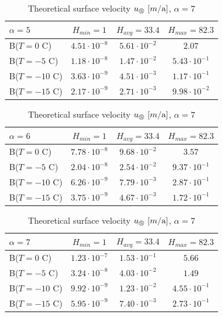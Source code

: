 \begin{table}[H]
    \centering
    	\caption{Theoretical surface velocity $u_\circledS\,\left[m / \text{a} \right]$, $\alpha = 5$}
	\begin{tabular}{lccc}
	\toprule
	$\alpha=5$ & $H_{min} = 1$ & $H_{avg}=33.4$ & $H_{max} = 82.3$\\
	\midrule
	B($T=0$ C) & $4.51 \cdot 10^{-8}$ & $5.61 \cdot 10^{-2}$ & $2.07$ \\
	B($T=-5$ C) & $1.18 \cdot 10^{-8}$ & $1.47 \cdot 10^{-2}$ & $5.43 \cdot 10^{-1}$ \\
	B($T=-10$ C) & $3.63 \cdot 10^{-9}$ & $4.51 \cdot 10^{-3}$ & $1.17 \cdot 10^{-1}$ \\

	B($T=-15$ C) & $2.17 \cdot 10^{-9}$ & $2.71 \cdot 10^{-3}$ & $9.98 \cdot 10^{-2}$\\
	\bottomrule	
	\end{tabular}
	\label{GPS:tab:theorytable5}
	
	\caption{Theoretical surface velocity $u_\circledS\,\left[m / \text{a} \right]$, $\alpha = 6$}
	\begin{tabular}{lccc}
	\toprule
	$\alpha=6$  & $H_{min} = 1$ & $H_{avg}=33.4$ & $H_{max} = 82.3$ \\
	\midrule
	B($T=0$ C) & $7.78 \cdot 10^{-8}$ & $9.68 \cdot 10^{-2}$ & $3.57$ \\

	B($T=-5$ C) & $2.04 \cdot 10^{-8}$ & $2.54 \cdot 10^{-2}$ & $9.37 \cdot 10^{-1}$ \\
	B($T=-10$ C) & $6.26 \cdot 10^{-9}$ & $7.79 \cdot 10^{-3}$ & $2.87 \cdot 10^{-1}$ \\
	B($T=-15$ C) & $3.75 \cdot 10^{-9}$ & $4.67 \cdot 10^{-3}$ & $1.72 \cdot 10^{-1}$\\
	\bottomrule	
	\end{tabular}
	\label{GPS:tab:theorytable6}
    
    \caption{Theoretical surface velocity $u_\circledS\,\left[m / \text{a} \right]$, $\alpha = 7$}
	\begin{tabular}{lccc}
	\toprule
	$\alpha=7$  & $H_{min} = 1$ & $H_{avg}=33.4$ & $H_{max} = 82.3$ \\
	\midrule
	B($T=0$ C) & $1.23 \cdot 10^{-7}$ & $1.53 \cdot 10^{-1}$ & $5.66$ \\
	B($T=-5$ C) & $3.24 \cdot 10^{-8}$ & $4.03 \cdot 10^{-2}$ & $1.49$ \\
	B($T=-10$ C) & $9.92 \cdot 10^{-9}$ & $1.23 \cdot 10^{-2}$ & $4.55 \cdot 10^{-1}$ \\
	B($T=-15$ C) & $5.95 \cdot 10^{-9}$ & $7.40 \cdot 10^{-3}$ & $2.73 \cdot 10^{-1}$\\
	\bottomrule	
	\end{tabular}
	\label{GPS:tab:theorytable7}
\end{table}

